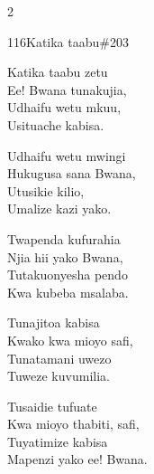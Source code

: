 \begin{multicols}{2}
\begin{hymn}{116}{Katika taabu}{\#203}
\begin{stanza}
Katika taabu zetu\\
Ee! Bwana tunakujia,\\
Udhaifu wetu mkuu,\\
Usituache kabisa.
\end{stanza}
\begin{chorus}
Udhaifu wetu mwingi\\
Hukugusa sana Bwana,\\
Utusikie kilio,\\
Umalize kazi yako.
\end{chorus}
\begin{stanza}
Twapenda kufurahia\\
Njia hii yako Bwana,\\
Tutakuonyesha pendo\\
Kwa kubeba msalaba.
\end{stanza}
\begin{stanza}
Tunajitoa kabisa\\
Kwako kwa mioyo safi,\\
Tunatamani uwezo\\
Tuweze kuvumilia.
\end{stanza}
\begin{stanza}
Tusaidie tufuate\\
Kwa mioyo thabiti, safi,\\
Tuyatimize kabisa\\
Mapenzi yako ee! Bwana.
\end{stanza}
\end{hymn}


\end{multicols}
